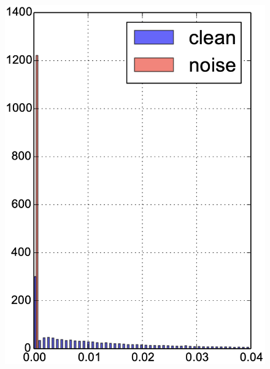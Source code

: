 \begin{figure}[t]
\centering
\iflatexml
\includegraphics[width=3\columnwidth]{figures/uncondition.png}

\end{figure}
